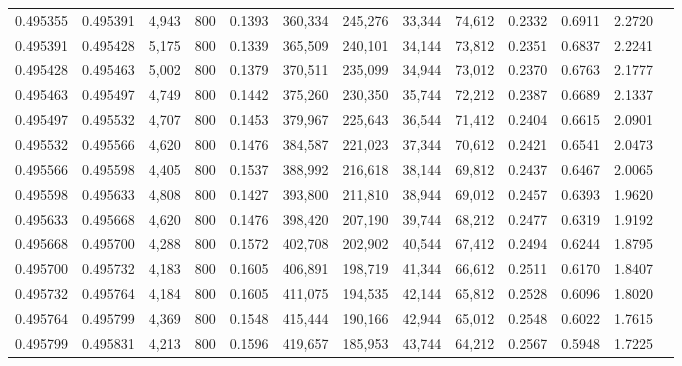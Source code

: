 \begin{tabular}{rrrrrrrrrrrrr}
0.495355 & 0.495391 &  4,943 & 800 &                                     0.1393 & 360,334 & 245,276 &  33,344 &  74,612 & 0.2332 & 0.6911 & 2.2720 \\
0.495391 & 0.495428 &  5,175 & 800 &                                     0.1339 & 365,509 & 240,101 &  34,144 &  73,812 & 0.2351 & 0.6837 & 2.2241 \\
0.495428 & 0.495463 &  5,002 & 800 &                                     0.1379 & 370,511 & 235,099 &  34,944 &  73,012 & 0.2370 & 0.6763 & 2.1777 \\
0.495463 & 0.495497 &  4,749 & 800 &                                     0.1442 & 375,260 & 230,350 &  35,744 &  72,212 & 0.2387 & 0.6689 & 2.1337 \\
0.495497 & 0.495532 &  4,707 & 800 &                                     0.1453 & 379,967 & 225,643 &  36,544 &  71,412 & 0.2404 & 0.6615 & 2.0901 \\
0.495532 & 0.495566 &  4,620 & 800 &                                     0.1476 & 384,587 & 221,023 &  37,344 &  70,612 & 0.2421 & 0.6541 & 2.0473 \\
0.495566 & 0.495598 &  4,405 & 800 &                                     0.1537 & 388,992 & 216,618 &  38,144 &  69,812 & 0.2437 & 0.6467 & 2.0065 \\
0.495598 & 0.495633 &  4,808 & 800 &                                     0.1427 & 393,800 & 211,810 &  38,944 &  69,012 & 0.2457 & 0.6393 & 1.9620 \\
0.495633 & 0.495668 &  4,620 & 800 &                                     0.1476 & 398,420 & 207,190 &  39,744 &  68,212 & 0.2477 & 0.6319 & 1.9192 \\
0.495668 & 0.495700 &  4,288 & 800 &                                     0.1572 & 402,708 & 202,902 &  40,544 &  67,412 & 0.2494 & 0.6244 & 1.8795 \\
0.495700 & 0.495732 &  4,183 & 800 &                                     0.1605 & 406,891 & 198,719 &  41,344 &  66,612 & 0.2511 & 0.6170 & 1.8407 \\
0.495732 & 0.495764 &  4,184 & 800 &                                     0.1605 & 411,075 & 194,535 &  42,144 &  65,812 & 0.2528 & 0.6096 & 1.8020 \\
0.495764 & 0.495799 &  4,369 & 800 &                                     0.1548 & 415,444 & 190,166 &  42,944 &  65,012 & 0.2548 & 0.6022 & 1.7615 \\
0.495799 & 0.495831 &  4,213 & 800 &                                     0.1596 & 419,657 & 185,953 &  43,744 &  64,212 & 0.2567 & 0.5948 & 1.7225 \\

\end{tabular}
